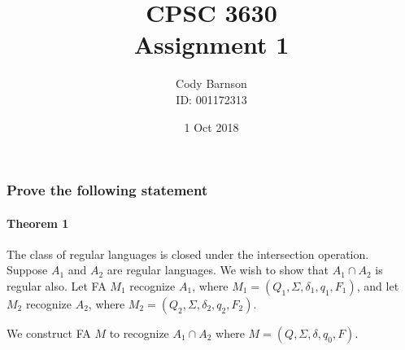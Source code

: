 \documentclass{article}
\begin{document}
	
\title{CPSC 3630\\Assignment 1}
\author{Cody Barnson\\ ID: 001172313}
\date{1 Oct 2018}


\maketitle
\newpage

\newpage


		
		
		
\section*{}

\subsection{}

\subsubsection{Prove the following statement}

\paragraph{Theorem 1} The class of regular languages is closed under the intersection operation. \\

Suppose $A_1$ and $A_2$ are regular languages.  We wish to show that $A_1 \cap A_2$ is regular also.  Let FA $M_1$ recognize $A_1$, where $M_1 = (Q_1, \Sigma, \delta_1, q_1, F_1)$, and let $M_2$ recognize $A_2$, where $M_2 = (Q_2, \Sigma, \delta_2, q_2, F_2)$.

We construct FA $M$ to recognize $A_1 \cap A_2$ where $M = (Q, \Sigma, \delta, q_0, F)$.  
\end{document}
